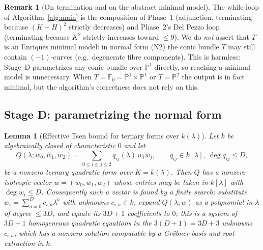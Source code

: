\documentclass{amsart}
\theoremstyle{plain}
\newtheorem{lemma}{Lemma}
\theoremstyle{definition}
\newtheorem{remark}{Remark}
\newcommand{\PP}{\mathbb{P}}
\begin{document}
\begin{remark}[On termination and on the abstract minimal model]\label{rem:terminal}
The while-loop of Algorithm~\ref{alg:main} is the composition of Phase~1
(adjunction, terminating because $(K+H)^2$ strictly decreases) and Phase~2's Del
Pezzo loop (terminating because $K^2$ strictly increases toward $\le9$).  We do
\emph{not} assert that $T$ is an Enriques minimal model: in normal form (N2) the
conic bundle $T$ may still contain $(-1)$-curves (e.g.\ degenerate fibre
components).  This is harmless: Stage~D parametrizes any conic bundle over
$\PP^1$ directly, so reaching a minimal model is unnecessary.  When $T=\mathbb
F_0=\PP^1\times\PP^1$ or $T=\PP^2$ the output is in fact minimal, but the
algorithm's correctness does not rely on this.
\end{remark}

\subsection{Stage D: parametrizing the normal form}

\begin{lemma}[Effective Tsen bound for ternary forms over $k(\lambda)$]
\label{lem:tsen}
Let $k$ be algebraically closed of characteristic $0$ and let
\[
Q(\lambda;w_0,w_1,w_2)=\sum_{0\le i\le j\le 2} q_{ij}(\lambda)\,w_iw_j ,
\qquad q_{ij}\in k[\lambda],\ \deg q_{ij}\le D,
\]
be a nonzero ternary quadratic form over $K=k(\lambda)$.  Then $Q$ has a nonzero
isotropic vector $w=(w_0,w_1,w_2)$ whose entries may be taken in $k[\lambda]$
with $\deg w_i\le D$.  Consequently such a vector is found by a finite search:
substitute $w_i=\sum_{a=0}^{D}c_{i,a}\lambda^a$ with unknowns $c_{i,a}\in k$,
expand $Q(\lambda;w)$ as a polynomial in $\lambda$ of degree $\le 3D$, and equate
its $3D+1$ coefficients to $0$; this is a system of $3D+1$ homogeneous quadratic
equations in the $3(D+1)=3D+3$ unknowns $c_{i,a}$, which has a nonzero solution
computable by a Gr\"obner basis and root extraction in $k$.
\end{lemma}
\end{document}
